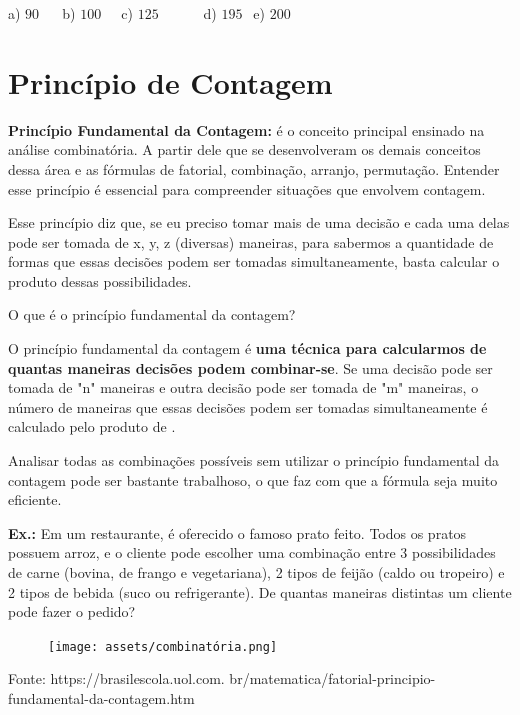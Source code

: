 \begin{multicols*}{2}
		      a) $90 \ \ \ \ \ \ $ b) $100 \ \ \ \ \ $ c) $125 \ \ \ \ \ \ \ \ \ \ \ \ \ $ d) $195 \ \ $ e) $200 \ \ $


	\section{Princípio de Contagem}

	\textbf{Princípio Fundamental da Contagem:} é o  conceito principal ensinado na análise combinatória. A partir dele que se desenvolveram os demais conceitos dessa área e as fórmulas de fatorial, combinação, arranjo, permutação. Entender esse princípio é essencial para compreender situações que envolvem contagem.

	Esse princípio diz que, se eu preciso tomar mais de uma decisão e cada uma delas pode ser tomada de x, y, z (diversas) maneiras, para sabermos a quantidade de formas que essas decisões podem ser tomadas simultaneamente, basta calcular o produto dessas possibilidades.

	O que é o princípio fundamental da contagem?

	O princípio fundamental da contagem é \textbf{uma técnica para calcularmos de quantas maneiras decisões podem combinar-se}. Se uma decisão pode ser tomada de "n" maneiras e outra decisão pode ser tomada de "m" maneiras, o número de maneiras que essas decisões podem ser tomadas simultaneamente é calculado pelo produto de .

	Analisar todas as combinações possíveis sem utilizar o princípio fundamental da contagem pode ser bastante trabalhoso, o que faz com que a fórmula seja muito eficiente.

	\textbf{Ex.:} Em um restaurante, é oferecido o famoso prato feito. Todos os pratos possuem arroz, e o cliente pode escolher uma combinação entre 3 possibilidades de carne (bovina, de frango e vegetariana), 2 tipos de feijão (caldo ou tropeiro) e 2 tipos de bebida (suco ou refrigerante). De quantas maneiras distintas um cliente pode fazer o pedido?

	\begin{figure}[H]
		\centering
		\texttt{[image: assets/combinatória.png]}
	\end{figure}
	Fonte: https://brasilescola.uol.com. br/matematica/fatorial-principio- fundamental-da-contagem.htm


\end{multicols*}
